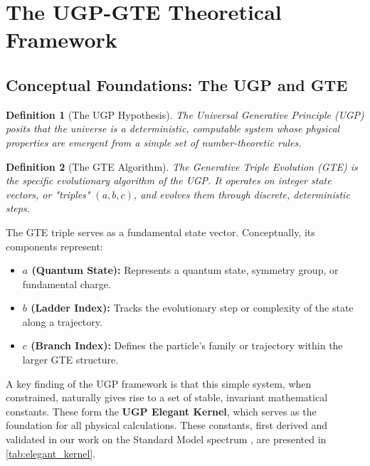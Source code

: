 \documentclass[9pt,twocolumn]{extarticle}
\newtheorem{definition}{Definition}
\begin{document}
\section{The UGP-GTE Theoretical Framework}
\subsection{Conceptual Foundations: The UGP and GTE}
\begin{definition}[The UGP Hypothesis]
The Universal Generative Principle (UGP) posits that the universe is a deterministic, computable system whose physical properties are emergent from a simple set of number-theoretic rules.
\end{definition}

\begin{definition}[The GTE Algorithm]
The Generative Triple Evolution (GTE) is the specific evolutionary algorithm of the UGP. It operates on integer state vectors, or "triples" $(a, b, c)$, and evolves them through discrete, deterministic steps.
\end{definition}

The GTE triple serves as a fundamental state vector. Conceptually, its components represent:
\begin{itemize}[leftmargin=1.2em,itemsep=0.2em]
    \item \textbf{$a$ (Quantum State):} Represents a quantum state, symmetry group, or fundamental charge.
    \item \textbf{$b$ (Ladder Index):} Tracks the evolutionary step or complexity of the state along a trajectory.
    \item \textbf{$c$ (Branch Index):} Defines the particle's family or trajectory within the larger GTE structure.
\end{itemize}
A key finding of the UGP framework is that this simple system, when constrained, naturally gives rise to a set of stable, invariant mathematical constants. These form the \textbf{UGP Elegant Kernel}, which serves as the foundation for all physical calculations. These constants, first derived and validated in our work on the Standard Model spectrum \cite{SpivackSM}, are presented in \cref{tab:elegant_kernel}.
\end{document}
